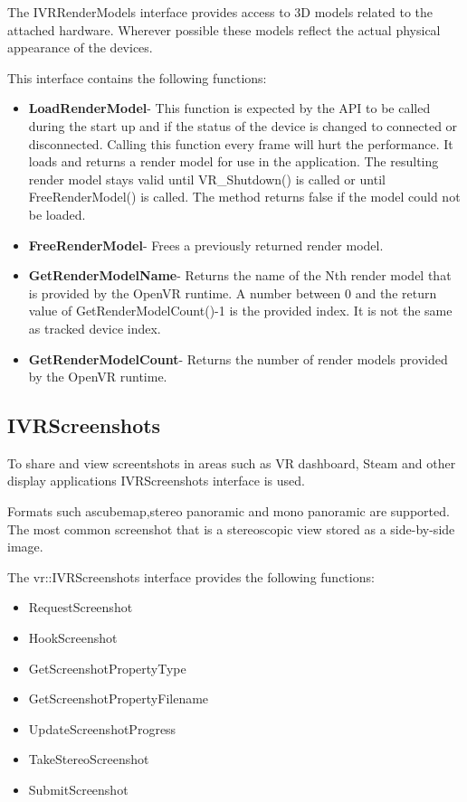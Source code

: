 \documentclass[journal]{IEEEtran}
\begin{document}
The IVRRenderModels interface provides access to 3D models related to the attached hardware. Wherever possible these models reflect the actual physical appearance of the devices.

This interface contains the following functions:

\begin{itemize}
	\item \textbf{LoadRenderModel}- This function is expected by the API to be called during the start up and if the status of the device is changed to connected or disconnected. Calling this function every frame will hurt the performance. It loads and returns a render model for use in the application. The resulting render model stays valid until VR\_Shutdown() is called or until FreeRenderModel() is called. The method returns false if the model could not be loaded.
	
	\item \textbf{FreeRenderModel}-	Frees a previously returned render model.
	
	\item \textbf{GetRenderModelName}- Returns the name of the Nth render model that is provided by the OpenVR runtime. A number between 0 and the return value of GetRenderModelCount()-1 is the provided index. It is not the same as tracked device index. 
	
	\item \textbf{GetRenderModelCount}- Returns the number of render models provided by the OpenVR runtime.
	
\end{itemize}

\subsection{IVRScreenshots}
 To share and view screentshots in areas such as VR dashboard, Steam and other display applications IVRScreenshots interface is used.

Formats such ascubemap,stereo panoramic and mono panoramic are supported.
The most common screenshot that is a stereoscopic view stored as a side-by-side image.

The vr::IVRScreenshots interface provides the following functions:

\begin{itemize}

	\item RequestScreenshot
	\item HookScreenshot
	\item GetScreenshotPropertyType
	\item GetScreenshotPropertyFilename
    \item UpdateScreenshotProgress
    \item TakeStereoScreenshot
	\item SubmitScreenshot
	
\end{itemize}
\end{document}

